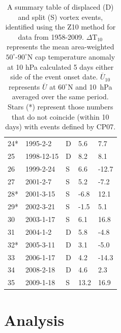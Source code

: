 \begin{table}
\begin{centering}
\begin{tabular}{|l|l|l|l|l|}
    24* & 1995-2-2    & D          & 5.6        & 7.7 \\
    25  & 1998-12-15  & D          & 8.2        & 8.1 \\
    26  & 1999-2-24   & S          & 6.6        & -12.7 \\
    27  & 2001-2-7    & S          & 5.2        & -7.2 \\
    28* & 2001-3-15   & S          & -6.8       & 12.1 \\
    29* & 2002-3-21   & S          & -1.5       & 5.1 \\
    30  & 2003-1-17   & S          & 6.1        & 16.8 \\
    31  & 2004-1-2    & D          & 5.8        & -4.8 \\
    32* & 2005-3-11   & D          & 3.1        & -5.0 \\
    33  & 2006-1-17   & D          & 4.2        & -14.3 \\
    34  & 2008-2-18   & D          & 4.6        & 2.3 \\
    35  & 2009-1-18   & S          & 13.2       & 16.9 \\ \hline
    \end{tabular}
    \caption{A summary table of displaced (D) and split (S) vortex events,
      identified using the Z10 method for data from 1958-2009.
      $\Delta \mathrm{T}_{10}$ represents the mean area-weighted
      $50^{\circ}$-$90^{\circ}$N cap temperature anomaly at 10 hPa calculated 5
      days either side of the event onset date. $\overline{U}_{10}$ represents
      $\overline{U}$ at $60^{\circ}$N and 10~hPa averaged over the same
      period. Stars (*) represent those numbers that do not coincide (within 10
      days) with events defined by CP07.}
\end{centering}
\label{tab:events}
\end{table}


\section{Analysis}
\label{sec:moments_analysis}

